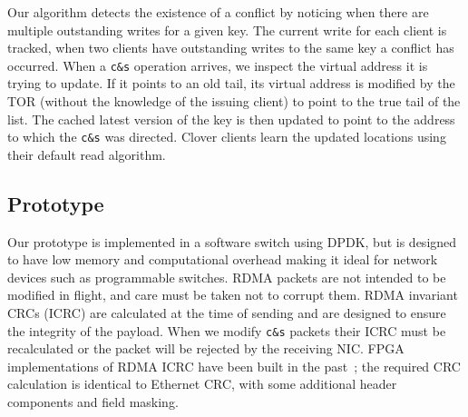 Our algorithm detects the existence of a conflict by noticing when
there are multiple outstanding writes for a given key. The current
write for each client is tracked, when two clients have outstanding
writes to the same key a conflict has occurred. When a \texttt{c\&s}
operation arrives, we inspect the virtual address it is trying to
update. If it points to an old tail, its virtual address is modified
by the TOR (without the knowledge of the issuing client) to point to
the true tail of the list. The cached latest version of the key is
then updated to point to the address to which the \texttt{c\&s} was
directed. Clover clients learn the updated locations using their
default read algorithm.

\subsection{Prototype}

Our prototype is implemented in a software switch using DPDK, but is
designed to have low memory and computational overhead making it ideal
for network devices such as programmable switches.  RDMA packets are
not intended to be modified in flight, and care must be taken not to
corrupt them. RDMA invariant CRCs (ICRC) are calculated at the time of
sending and are designed to ensure the integrity of the payload. When
we modify \texttt{c\&s} packets their ICRC must be recalculated or the packet
will be rejected by the receiving NIC. FPGA implementations of RDMA
ICRC have been built in the past~\cite{Mansour_2019}; the required CRC
calculation is identical to Ethernet CRC, with some additional header
components and field masking.
